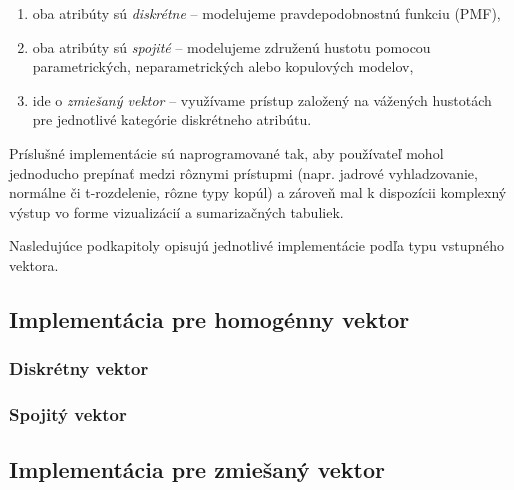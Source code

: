 \begin{enumerate}
  \item oba atribúty sú \textit{diskrétne} – modelujeme pravdepodobnostnú funkciu (PMF),
  \item oba atribúty sú \textit{spojité} – modelujeme združenú hustotu pomocou parametrických, neparametrických alebo kopulových modelov,
  \item ide o \textit{zmiešaný vektor} – využívame prístup založený na vážených hustotách pre jednotlivé kategórie diskrétneho atribútu.
\end{enumerate}

Príslušné implementácie sú naprogramované tak, aby používateľ mohol jednoducho prepínať medzi rôznymi prístupmi (napr. jadrové vyhladzovanie, normálne či t-rozdelenie, rôzne typy kopúl) a zároveň mal k dispozícii komplexný výstup vo forme vizualizácií a sumarizačných tabuliek.

Nasledujúce podkapitoly opisujú jednotlivé implementácie podľa typu vstupného vektora.

\subsection{Implementácia pre homogénny vektor}\label{subsec:homo_vector_implementation}

\subsubsection{Diskrétny vektor}

\subsubsection{Spojitý vektor}

\subsection{Implementácia pre zmiešaný vektor}